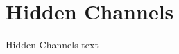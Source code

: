 
\section{Hidden Channels}\fbeg{}\begin{frame}{}

{\fontsize{20}{23}\selectfont

Hidden Channels text

}

\end{frame}

